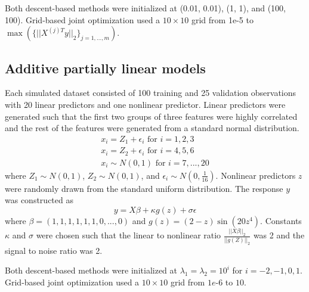 \documentclass[10pt,letterpaper]{article}
\begin{document}
Both descent-based methods were initialized at (0.01, 0.01), (1, 1), and (100, 100). Grid-based joint optimization used a $10 \times 10$ grid from 1e-5 to $\max(\{||X^{(j)T}y ||_2\}_{j=1,..., m})$.

\subsection{Additive partially linear models}

Each simulated dataset consisted of 100 training and 25 validation observations with 20 linear predictors and one nonlinear predictor. Linear predictors were generated such that the first two groups of three features were highly correlated and the rest of the features were generated from a standard normal distribution.
\begin{equation}
\begin{array}{c}
x_i = Z_1 + \epsilon_i \text{ for } i=1, 2, 3 \\
x_i = Z_2 + \epsilon_i \text{ for } i= 4, 5, 6 \\
x_i \sim N(0,1) \text{ for } i = 7, ..., 20
\end{array}
\end{equation}
where $Z_1 \sim N(0,1)$, $Z_2 \sim N(0,1)$, and $\epsilon_i \sim N(0, \frac{1}{16})$. Nonlinear predictors $z$ were randomly drawn from the standard uniform distribution. The response $y$ was constructed as
\begin{equation}
y = X\beta + \kappa g(z) + \sigma \epsilon
\end{equation}
where $\beta = (1, 1, 1, 1, 1, 1, 0, ..., 0)$ and $g(z) =(2-z)\sin(20z^4)$. Constants $\kappa$ and $\sigma$ were chosen such that the linear to nonlinear ratio $\frac{||X\beta||_2}{||g(Z)||_2}$ was 2 and the signal to noise ratio was 2. 

Both descent-based methods were initialized at $\lambda_1 = \lambda_2 = 10^i$ for $i=-2, -1, 0, 1$. Grid-based joint optimization used a $10 \times 10$ grid from $1e\text{-}6$ to $10$.
\end{document}
